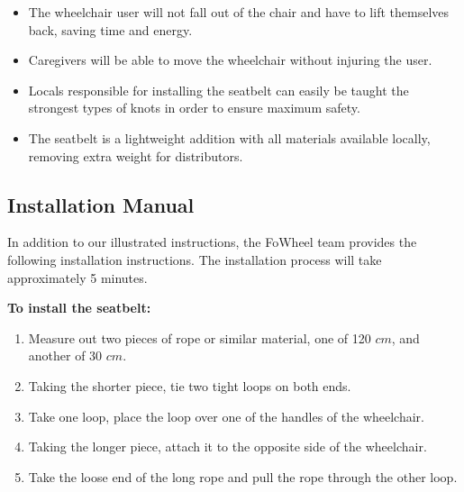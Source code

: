 \documentclass[12pt]{report}
\begin{document}
\begin{itemize}
    \item The wheelchair user will not fall out of the chair and
have to lift themselves back, saving time and energy.
\item Caregivers will be able to move the wheelchair without injuring the user.
\item Locals responsible for installing the seatbelt can easily be taught the
strongest types of knots in order to ensure maximum safety.
\item The seatbelt is a lightweight addition with all materials available
    locally, removing extra weight for distributors.
\end{itemize}


\subsection{Installation Manual}
In addition to our illustrated instructions, the FoWheel team provides the
following installation instructions. The installation process will take
approximately 5 minutes.

\textbf{To install the seatbelt:}

\begin{enumerate}
    \item Measure out two pieces of rope or similar material, one of 120 $cm$,
        and another of 30 $cm$.
    \item Taking the shorter piece, tie two tight loops on both ends.
    \item Take one loop, place the loop over one of the handles of the
        wheelchair.
    \item Taking the longer piece, attach it to the opposite side of the
        wheelchair.
    \item Take the loose end of the long rope and pull the rope through the other loop.
\end{enumerate}
\end{document}
